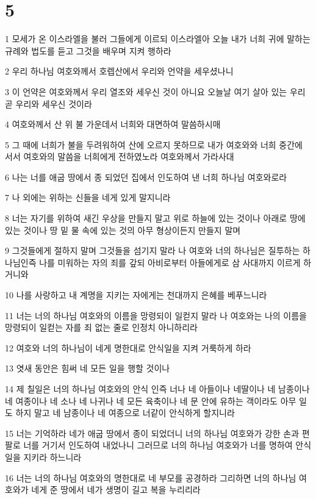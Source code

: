 \chapter{5}

\par 1 모세가 온 이스라엘을 불러 그들에게 이르되 이스라엘아 오늘 내가 너희 귀에 말하는 규례와 법도를 듣고 그것을 배우며 지켜 행하라
\par 2 우리 하나님 여호와께서 호렙산에서 우리와 언약을 세우셨나니
\par 3 이 언약은 여호와께서 우리 열조와 세우신 것이 아니요 오늘날 여기 살아 있는 우리 곧 우리와 세우신 것이라
\par 4 여호와께서 산 위 불 가운데서 너희와 대면하여 말씀하시매
\par 5 그 때에 너희가 불을 두려워하여 산에 오르지 못하므로 내가 여호와와 너희 중간에 서서 여호와의 말씀을 너희에게 전하였노라 여호와께서 가라사대
\par 6 나는 너를 애굽 땅에서 종 되었던 집에서 인도하여 낸 너희 하나님 여호와로라
\par 7 나 외에는 위하는 신들을 네게 있게 말지니라
\par 8 너는 자기를 위하여 새긴 우상을 만들지 말고 위로 하늘에 있는 것이나 아래로 땅에 있는 것이나 땅 밑 물 속에 있는 것의 아무 형상이든지 만들지 말며
\par 9 그것들에게 절하지 말며 그것들을 섬기지 말라 나 여호와 너의 하나님은 질투하는 하나님인즉 나를 미워하는 자의 죄를 갚되 아비로부터 아들에게로 삼 사대까지 이르게 하거니와
\par 10 나를 사랑하고 내 계명을 지키는 자에게는 천대까지 은혜를 베푸느니라
\par 11 너는 너의 하나님 여호와의 이름을 망령되이 일컫지 말라 나 여호와는 나의 이름을 망령되이 일컫는 자를 죄 없는 줄로 인정치 아니하리라
\par 12 여호와 너의 하나님이 네게 명한대로 안식일을 지켜 거룩하게 하라
\par 13 엿새 동안은 힘써 네 모든 일을 행할 것이나
\par 14 제 칠일은 너의 하나님 여호와의 안식 인즉 너나 네 아들이나 네딸이나 네 남종이나 네 여종이나 네 소나 네 나귀나 네 모든 육축이나 네 문 안에 유하는 객이라도 아무 일도 하지 말고 네 남종이나 네 여종으로 너같이 안식하게 할지니라
\par 15 너는 기억하라 네가 애굽 땅에서 종이 되었더니 너의 하나님 여호와가 강한 손과 편 팔로 너를 거기서 인도하여 내었나니 그러므로 너의 하나님 여호와가 너를 명하여 안식일을 지키라 하느니라
\par 16 너는 너의 하나님 여호와의 명한대로 네 부모를 공경하라 그리하면 너의 하나님 여호와가 네게 준 땅에서 네가 생명이 길고 복을 누리리라
